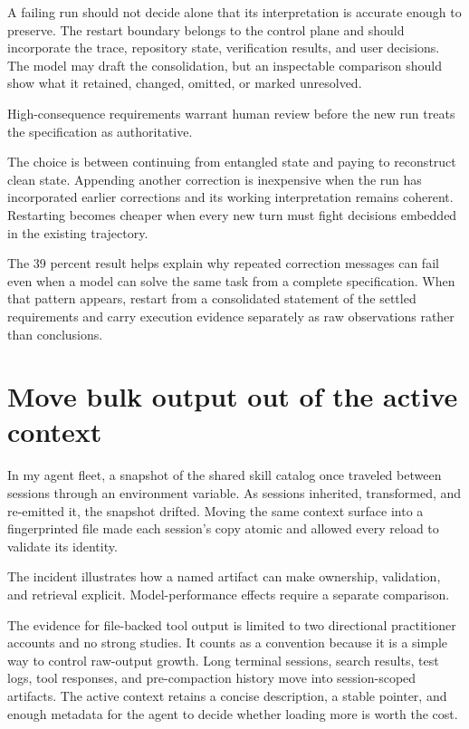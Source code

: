 A failing run should not decide alone that its interpretation is accurate enough to preserve. The restart boundary belongs to the control plane and should incorporate the trace, repository state, verification results, and user decisions. The model may draft the consolidation, but an inspectable comparison should show what it retained, changed, omitted, or marked unresolved.

High-consequence requirements warrant human review before the new run treats the specification as authoritative.

The choice is between continuing from entangled state and paying to reconstruct clean state. Appending another correction is inexpensive when the run has incorporated earlier corrections and its working interpretation remains coherent. Restarting becomes cheaper when every new turn must fight decisions embedded in the existing trajectory.

The 39 percent result helps explain why repeated correction messages can fail even when a model can solve the same task from a complete specification. When that pattern appears, restart from a consolidated statement of the settled requirements and carry execution evidence separately as raw observations rather than conclusions.

\hypertarget{move-bulk-output-out-of-the-active-context}{%
\section{Move bulk output out of the active context}\label{move-bulk-output-out-of-the-active-context}}

In my agent fleet, a snapshot of the shared skill catalog once traveled between sessions through an environment variable. As sessions inherited, transformed, and re-emitted it, the snapshot drifted. Moving the same context surface into a fingerprinted file made each session's copy atomic and allowed every reload to validate its identity.

The incident illustrates how a named artifact can make ownership, validation, and retrieval explicit. Model-performance effects require a separate comparison.

The evidence for file-backed tool output is limited to two directional practitioner accounts and no strong studies. It counts as a convention because it is a simple way to control raw-output growth. Long terminal sessions, search results, test logs, tool responses, and pre-compaction history move into session-scoped artifacts. The active context retains a concise description, a stable pointer, and enough metadata for the agent to decide whether loading more is worth the cost.


